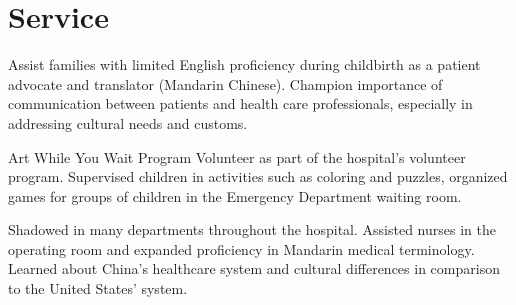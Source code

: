 
\section{Service}

Assist families with limited English proficiency during childbirth as a patient advocate and translator (Mandarin Chinese). Champion importance of communication between patients and health care professionals, especially in addressing cultural needs and customs.
\sectionsep

Art While You Wait Program Volunteer as part of the hospital’s volunteer program.  Supervised children in activities such as coloring and puzzles, organized games for groups of children in the Emergency Department waiting room.
\sectionsep 

Shadowed in many departments throughout the hospital. Assisted nurses in the operating room and expanded proficiency in Mandarin medical terminology. Learned about China’s healthcare system and cultural differences in comparison to the United States’ system.
\sectionsep

